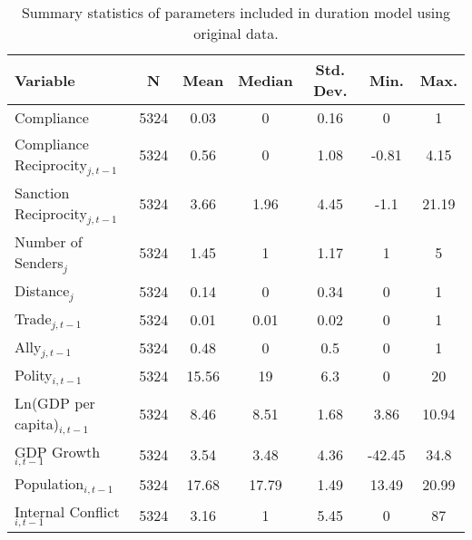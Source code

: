 \begin{table}[ht]
\centering
\begingroup\normalsize
\begin{tabular}{lcccccc}
 Variable & N & Mean & Median & Std. Dev. & Min. & Max. \\ 
  \hline
\hline
Compliance & 5324 & 0.03 & 0 & 0.16 & 0 & 1 \\ 
  Compliance Reciprocity$_{j,t-1}$ & 5324 & 0.56 & 0 & 1.08 & -0.81 & 4.15 \\ 
  Sanction Reciprocity$_{j,t-1}$ & 5324 & 3.66 & 1.96 & 4.45 & -1.1 & 21.19 \\ 
  Number of Senders$_{j}$ & 5324 & 1.45 & 1 & 1.17 & 1 & 5 \\ 
  Distance$_{j}$ & 5324 & 0.14 & 0 & 0.34 & 0 & 1 \\ 
  Trade$_{j,t-1}$ & 5324 & 0.01 & 0.01 & 0.02 & 0 & 1 \\ 
  Ally$_{j,t-1}$ & 5324 & 0.48 & 0 & 0.5 & 0 & 1 \\ 
  Polity$_{i,t-1}$ & 5324 & 15.56 & 19 & 6.3 & 0 & 20 \\ 
  Ln(GDP per capita)$_{i,t-1}$ & 5324 & 8.46 & 8.51 & 1.68 & 3.86 & 10.94 \\ 
  GDP Growth$_{i,t-1}$ & 5324 & 3.54 & 3.48 & 4.36 & -42.45 & 34.8 \\ 
  Population$_{i,t-1}$ & 5324 & 17.68 & 17.79 & 1.49 & 13.49 & 20.99 \\ 
  Internal Conflict$_{i,t-1}$ & 5324 & 3.16 & 1 & 5.45 & 0 & 87 \\ 
   \hline
\hline
\end{tabular}
\endgroup
\caption{Summary statistics of parameters included in duration model using original data.} 
\label{tab:summNoImp}
\end{table}

